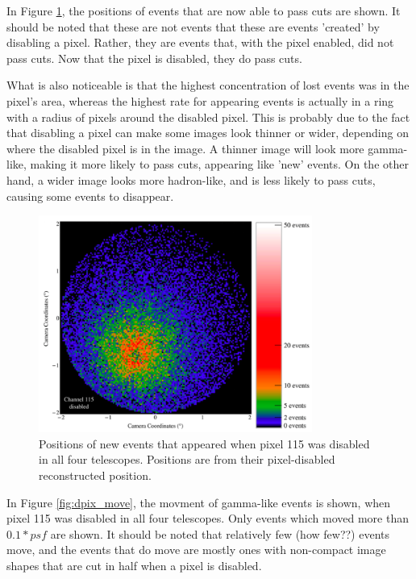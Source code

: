     In Figure \ref{fig:dpix_appear}, the positions of events that are now able to pass cuts are shown.
    It should be noted that these are not events that these are events 'created' by disabling a pixel.
    Rather, they are events that, with the pixel enabled, did not pass cuts.
    Now that the pixel is disabled, they do pass cuts.

    What is also noticeable is that the highest concentration of lost events was in the pixel's area, whereas the highest rate for appearing events is actually in a ring with a radius of  pixels around the disabled pixel.
    This is probably due to the fact that disabling a pixel can make some images look thinner or wider, depending on where the disabled pixel is in the image.
    A thinner image will look more gamma-like, making it more likely to pass cuts, appearing like 'new' events.
    On the other hand, a wider image looks more hadron-like, and is less likely to pass cuts, causing some events to disappear.

    \begin{figure}[ht]
      \centering
      \includegraphics[width=0.8\textwidth]{images/disabled_pixel/appearing_events}
      \caption[Newly Appearing Events]{
        Positions of new events that appeared when pixel 115 was disabled in all four telescopes.
        Positions are from their pixel-disabled reconstructed position.
      }
      \label{fig:dpix_appear}
    \end{figure}

    In Figure \ref{fig:dpix_move}, the movment of gamma-like events is shown, when pixel 115 was disabled in all four telescopes.
    Only events which moved more than $0.1*psf$ are shown.
    It should be noted that relatively few (how few??) events move, and the events that do move are mostly ones with non-compact image shapes that are cut in half when a pixel is disabled.

